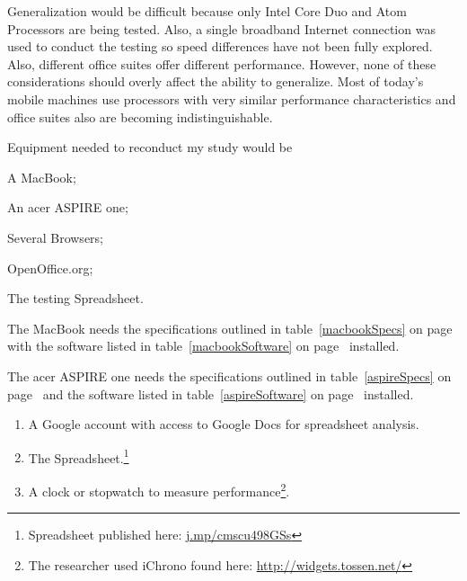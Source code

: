 Generalization would be difficult because only Intel Core Duo and Atom
Processors are being tested.  Also, a single broadband Internet connection was
used to conduct the testing so speed differences have not been fully explored.
Also, different office suites offer different performance.  However, none of
these considerations should overly affect the ability to generalize.  Most of
today's mobile machines use processors with very similar performance
characteristics and office suites also are becoming indistinguishable.

Equipment needed to reconduct my study would be
\begin{inparaenum}[(1)]
\item A MacBook;
\item An acer ASPIRE one;
\item Several Browsers;
\item OpenOffice.org;
\item The testing Spreadsheet.
\end{inparaenum}

The MacBook needs the specifications outlined in table~\ref{macbookSpecs} on
page~\pageref{macbookSpecs} with the software listed in
table~\ref{macbookSoftware} on page~\pageref{macbookSoftware} installed.

The acer ASPIRE one needs the specifications outlined in table~\ref{aspireSpecs}
on page~\pageref{aspireSpecs} and the software listed in
table~\ref{aspireSoftware} on page~\pageref{aspireSoftware} installed.


\begin{enumerate}

\item A Google account with access to Google Docs for spreadsheet analysis.

\item The Spreadsheet.\footnote{Spreadsheet published here:
  \url{j.mp/cmscu498GSs}}

\item A clock or stopwatch to measure performance\footnote{The researcher used
  iChrono found here: \url{http://widgets.tossen.net/}}.

\end{enumerate}






